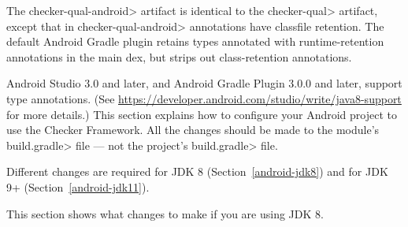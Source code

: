 The \<checker-qual-android> artifact is identical to the \<checker-qual>
artifact, except that in \<checker-qual-android> annotations have classfile
retention.  The default Android Gradle plugin retains types annotated with
runtime-retention annotations in the main dex, but strips out class-retention
annotations.



Android Studio 3.0 and later, and Android Gradle Plugin 3.0.0 and later, support type
annotations.  (See
\url{https://developer.android.com/studio/write/java8-support}
for more details.)  This section explains how to configure your Android
project to use the Checker Framework.  All the changes should be made to
the module's \<build.gradle> file --- not the project's \<build.gradle> file.

Different changes are required for JDK 8
(Section~\ref{android-jdk8}) and for JDK 9+ (Section~\ref{android-jdk11}).

This section shows what changes to make if you are using JDK 8.

